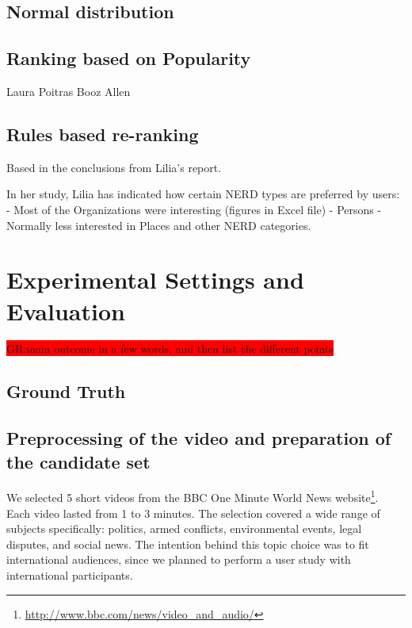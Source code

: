 \documentclass{llncs}
\newcommand{\todo}[1]{\colorbox{red}{#1}}
\begin{document}
\subsection{Normal distribution}

\subsection{Ranking based on Popularity}
Laura Poitras
Booz Allen



\subsection{Rules based re-ranking}
Based in the conclusions from Lilia's report. 

In her study, Lilia has indicated how certain NERD types are preferred by users:
- Most of the Organizations were interesting (figures in Excel file)
- Persons
- Normally less interested in Places and other NERD categories.


\section{Experimental Settings and Evaluation}
\label{sec:Evaluation}
\todo{GR:main outcome in a few words, and then list the different points}

\subsection{Ground Truth}
\subsection{Preprocessing of the video and preparation of the candidate set}

We selected 5 short videos from the BBC One Minute World News website\footnote{\url{http://www.bbc.com/news/video_and_audio/}}. Each video lasted from 1 to 3 minutes. The selection covered a wide range of subjects specifically: politics, armed conflicts, environmental events, legal disputes, and social news. The intention behind this topic choice was to fit international audiences, since we planned to perform a user study with international participants. 
\end{document}
